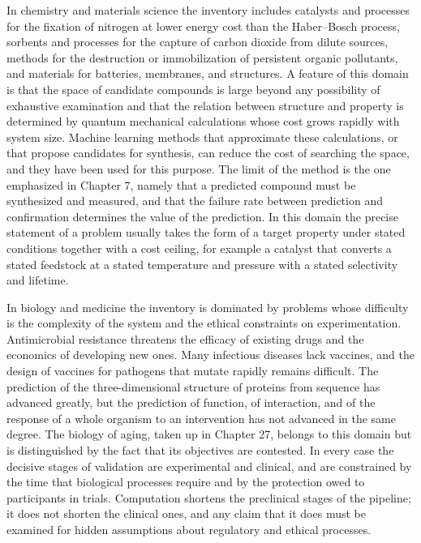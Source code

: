 In chemistry and materials science the inventory includes catalysts and processes for the fixation of nitrogen at lower energy cost than the Haber--Bosch process, sorbents and processes for the capture of carbon dioxide from dilute sources, methods for the destruction or immobilization of persistent organic pollutants, and materials for batteries, membranes, and structures. A feature of this domain is that the space of candidate compounds is large beyond any possibility of exhaustive examination and that the relation between structure and property is determined by quantum mechanical calculations whose cost grows rapidly with system size. Machine learning methods that approximate these calculations, or that propose candidates for synthesis, can reduce the cost of searching the space, and they have been used for this purpose. The limit of the method is the one emphasized in Chapter 7, namely that a predicted compound must be synthesized and measured, and that the failure rate between prediction and confirmation determines the value of the prediction. In this domain the precise statement of a problem usually takes the form of a target property under stated conditions together with a cost ceiling, for example a catalyst that converts a stated feedstock at a stated temperature and pressure with a stated selectivity and lifetime.

In biology and medicine the inventory is dominated by problems whose difficulty is the complexity of the system and the ethical constraints on experimentation. Antimicrobial resistance threatens the efficacy of existing drugs and the economics of developing new ones. Many infectious diseases lack vaccines, and the design of vaccines for pathogens that mutate rapidly remains difficult. The prediction of the three-dimensional structure of proteins from sequence has advanced greatly, but the prediction of function, of interaction, and of the response of a whole organism to an intervention has not advanced in the same degree. The biology of aging, taken up in Chapter 27, belongs to this domain but is distinguished by the fact that its objectives are contested. In every case the decisive stages of validation are experimental and clinical, and are constrained by the time that biological processes require and by the protection owed to participants in trials. Computation shortens the preclinical stages of the pipeline; it does not shorten the clinical ones, and any claim that it does must be examined for hidden assumptions about regulatory and ethical processes.


